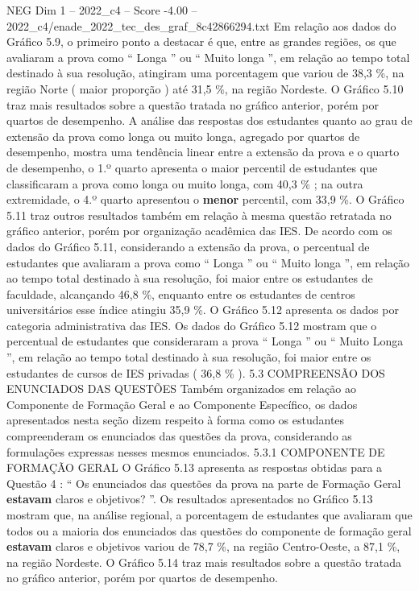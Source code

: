 \begin{textsample}{NEG Dim 1 – 2022\_c4 – Score -4.00 – 2022\_c4/enade\_2022\_tec\_des\_graf\_8c42866294.txt}
Em relação aos dados do Gráfico 5.9, o primeiro ponto a destacar é que, entre as grandes regiões, os que avaliaram a prova como “ Longa ” ou “ Muito longa ”, em relação ao tempo total destinado à sua resolução, atingiram uma porcentagem que variou de 38,3 \%, na região Norte ( maior proporção ) até 31,5 \%, na região Nordeste.
O Gráfico 5.10 traz mais resultados sobre a questão tratada no gráfico anterior, porém por quartos de desempenho.
A análise das respostas dos estudantes quanto ao grau de extensão da prova como longa ou muito longa, agregado por quartos de desempenho, mostra uma tendência linear entre a extensão da prova e o quarto de desempenho, o 1.º quarto apresenta o maior percentil de estudantes que classificaram a prova como longa ou muito longa, com 40,3 \% ; na outra extremidade, o 4.º quarto apresentou o \textbf{menor} percentil, com 33,9 \%.
O Gráfico 5.11 traz outros resultados também em relação à mesma questão retratada no gráfico anterior, porém por organização acadêmica das IES.
De acordo com os dados do Gráfico 5.11, considerando a extensão da prova, o percentual de estudantes que avaliaram a prova como “ Longa ” ou “ Muito longa ”, em relação ao tempo total destinado à sua resolução, foi maior entre os estudantes de faculdade, alcançando 46,8 \%, enquanto entre os estudantes de centros universitários esse índice atingiu 35,9 \%.
O Gráfico 5.12 apresenta os dados por categoria administrativa das IES.
Os dados do Gráfico 5.12 mostram que o percentual de estudantes que consideraram a prova “ Longa ” ou “ Muito Longa ”, em relação ao tempo total destinado à sua resolução, foi maior entre os estudantes de cursos de IES privadas ( 36,8 \% ). 5.3 COMPREENSÃO DOS ENUNCIADOS DAS QUESTÕES Também organizados em relação ao Componente de Formação Geral e ao Componente Específico, os dados apresentados nesta seção dizem respeito à forma como os estudantes compreenderam os enunciados das questões da prova, considerando as formulações expressas nesses mesmos enunciados. 5.3.1 COMPONENTE DE FORMAÇÃO GERAL O Gráfico 5.13 apresenta as respostas obtidas para a Questão 4 : “ Os enunciados das questões da prova na parte de Formação Geral \textbf{estavam} claros e objetivos? ”.
Os resultados apresentados no Gráfico 5.13 mostram que, na análise regional, a porcentagem de estudantes que avaliaram que todos ou a maioria dos enunciados das questões do componente de formação geral \textbf{estavam} claros e objetivos variou de 78,7 \%, na região Centro-Oeste, a 87,1 \%, na região Nordeste.
O Gráfico 5.14 traz mais resultados sobre a questão tratada no gráfico anterior, porém por quartos de desempenho.

\end{textsample}
